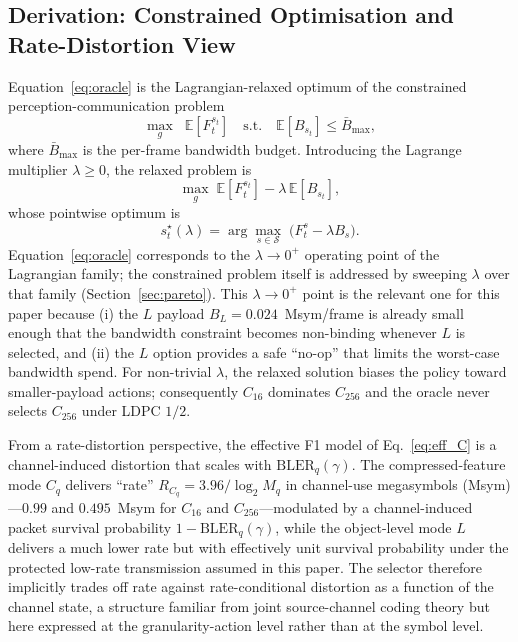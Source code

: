 \documentclass[journal]{IEEEtran}
\begin{document}
\subsection{Derivation: Constrained Optimisation and Rate-Distortion View}\label{sec:derivation}

Equation~\eqref{eq:oracle} is the Lagrangian-relaxed optimum of the constrained perception-communication problem
\begin{equation}
\max_g \;\;\mathbb{E}\!\left[F_t^{s_t}\right] \quad \text{s.t.} \quad \mathbb{E}\!\left[B_{s_t}\right] \le \bar B_{\max},
\label{eq:constrained}
\end{equation}
where $\bar B_{\max}$ is the per-frame bandwidth budget. Introducing the Lagrange multiplier $\lambda \ge 0$, the relaxed problem is
\begin{equation}
\max_g \;\mathbb{E}\!\left[F_t^{s_t}\right] - \lambda\,\mathbb{E}\!\left[B_{s_t}\right],
\end{equation}
whose pointwise optimum is
\begin{equation}
s_t^\star(\lambda) = \arg\max_{s \in \mathcal{S}}\; \bigl(F_t^s - \lambda B_s\bigr).
\label{eq:lagrangian_oracle}
\end{equation}
Equation~\eqref{eq:oracle} corresponds to the $\lambda \to 0^+$ operating point of the Lagrangian family; the constrained problem itself is addressed by sweeping $\lambda$ over that family (Section~\ref{sec:pareto}). This $\lambda \to 0^+$ point is the relevant one for this paper because (i) the $L$ payload $B_L = 0.024$~Msym/frame is already small enough that the bandwidth constraint becomes non-binding whenever $L$ is selected, and (ii) the $L$ option provides a safe ``no-op'' that limits the worst-case bandwidth spend. For non-trivial $\lambda$, the relaxed solution biases the policy toward smaller-payload actions; consequently $C_{16}$ dominates $C_{256}$ and the oracle never selects $C_{256}$ under LDPC $1/2$.

From a rate-distortion perspective, the effective F1 model of Eq.~\eqref{eq:eff_C} is a channel-induced distortion that scales with $\mathrm{BLER}_q(\gamma)$. The compressed-feature mode $C_q$ delivers ``rate'' $R_{C_q} = 3.96 / \log_2 M_q$ in channel-use megasymbols (Msym)---$0.99$ and $0.495$~Msym for $C_{16}$ and $C_{256}$---modulated by a channel-induced packet survival probability $1 - \mathrm{BLER}_q(\gamma)$, while the object-level mode $L$ delivers a much lower rate but with effectively unit survival probability under the protected low-rate transmission assumed in this paper. The selector therefore implicitly trades off rate against rate-conditional distortion as a function of the channel state, a structure familiar from joint source-channel coding theory but here expressed at the granularity-action level rather than at the symbol level.
\end{document}
